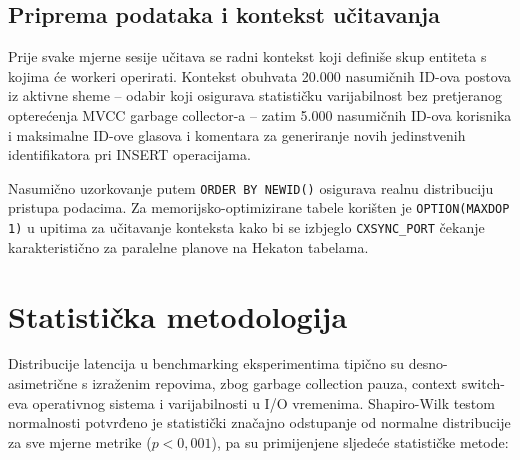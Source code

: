 \subsection{Priprema podataka i kontekst učitavanja}
\label{sec:priprema_podataka}

Prije svake mjerne sesije učitava se radni kontekst koji definiše skup entiteta s kojima će workeri operirati. Kontekst obuhvata 20.000 nasumičnih ID-ova postova iz aktivne sheme -- odabir koji osigurava statističku varijabilnost bez pretjeranog opterećenja MVCC garbage collector-a -- zatim 5.000 nasumičnih ID-ova korisnika i maksimalne ID-ove glasova i komentara za generiranje novih jedinstvenih identifikatora pri INSERT operacijama.

Nasumično uzorkovanje putem \texttt{ORDER BY NEWID()} osigurava realnu distribuciju pristupa podacima. Za memorijsko-optimizirane tabele korišten je \texttt{OPTION(MAXDOP 1)} u upitima za učitavanje konteksta kako bi se izbjeglo \texttt{CXSYNC\_PORT} čekanje karakteristično za paralelne planove na Hekaton tabelama.

\section{Statistička metodologija}
\label{sec:statistika}

Distribucije latencija u benchmarking eksperimentima tipično su desno-asimetrične s izraženim repovima, zbog garbage collection pauza, context switch-eva operativnog sistema i varijabilnosti u I/O vremenima. Shapiro-Wilk testom normalnosti potvrđeno je statistički značajno odstupanje od normalne distribucije za sve mjerne metrike ($p < 0,001$), pa su primijenjene sljedeće statističke metode:

